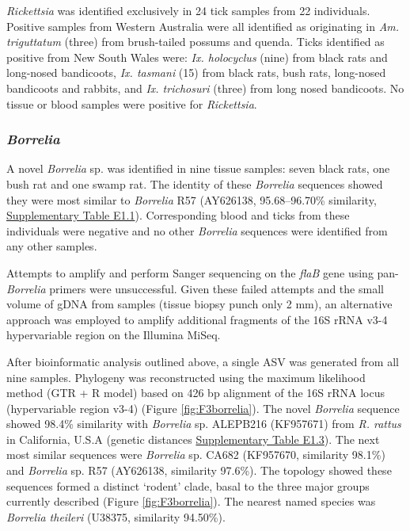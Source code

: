 \documentclass[a4paper, nobind]{templates/ociamthesis}
\begin{document}
\emph{Rickettsia} was identified exclusively in 24 tick samples from 22 individuals.
Positive samples from Western Australia were all identified as originating in \emph{Am. triguttatum} (three) from brush-tailed possums and quenda.
Ticks identified as positive from New South Wales were: \emph{Ix. holocyclus} (nine) from black rats and long-nosed bandicoots, \emph{Ix. tasmani} (15) from black rats, bush rats, long-nosed bandicoots and rabbits, and \emph{Ix. trichosuri} (three) from long nosed bandicoots.
No tissue or blood samples were positive for \emph{Rickettsia}.

\hypertarget{borrelia-2}{%
\subsubsection{\texorpdfstring{\emph{Borrelia}}{Borrelia}}\label{borrelia-2}}

A novel \emph{Borrelia} sp. was identified in nine tissue samples: seven black rats, one bush rat and one swamp rat. The identity of these \emph{Borrelia} sequences showed they were most similar to \emph{Borrelia} R57 (AY626138, 95.68--96.70\% similarity, \protect\hyperlink{supplementary-table-e1.3}{Supplementary Table E1.1}).
Corresponding blood and ticks from these individuals were negative and no other \emph{Borrelia} sequences were identified from any other samples.

Attempts to amplify and perform Sanger sequencing on the \emph{flaB} gene using pan-\emph{Borrelia} primers \autocite{lohNovelBorreliaSpecies2016} were unsuccessful.
Given these failed attempts and the small volume of gDNA from samples (tissue biopsy punch only 2 mm), an alternative approach was employed to amplify additional fragments of the 16S rRNA v3-4 hypervariable region on the Illumina MiSeq.

After bioinformatic analysis outlined above, a single ASV was generated from all nine samples.
Phylogeny was reconstructed using the maximum likelihood method (GTR + R model) based on 426 bp alignment of the 16S rRNA locus (hypervariable region v3-4) (Figure \ref{fig:F3borrelia}). The novel \emph{Borrelia} sequence showed 98.4\% similarity with \emph{Borrelia} sp. ALEPB216 (KF957671) from \emph{R. rattus} in California, U.S.A (genetic distances \protect\hyperlink{supplementary-table-e1.3}{Supplementary Table E1.3}). The next most similar sequences were \emph{Borrelia} sp. CA682 (KF957670, similarity 98.1\%) and \emph{Borrelia} sp. R57 (AY626138, similarity 97.6\%).
The topology showed these sequences formed a distinct `rodent' clade, basal to the three major groups currently described (Figure \ref{fig:F3borrelia}). The nearest named species was \emph{Borrelia theileri} (U38375, similarity 94.50\%).
\end{document}
